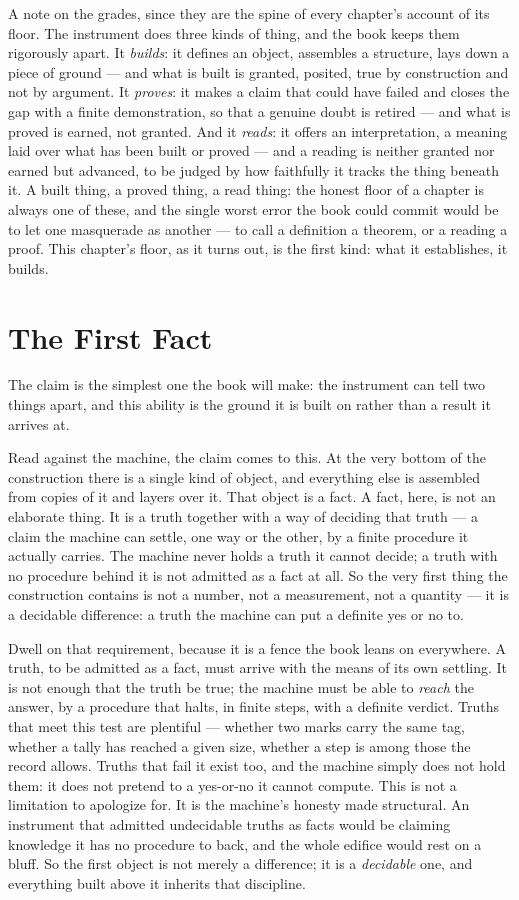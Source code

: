 A note on the grades, since they are the spine of every chapter's account of its floor. The instrument does
three kinds of thing, and the book keeps them rigorously apart. It \emph{builds}: it defines an object,
assembles a structure, lays down a piece of ground --- and what is built is granted, posited, true by
construction and not by argument. It \emph{proves}: it makes a claim that could have failed and closes the gap
with a finite demonstration, so that a genuine doubt is retired --- and what is proved is earned, not granted.
And it \emph{reads}: it offers an interpretation, a meaning laid over what has been built or proved --- and a
reading is neither granted nor earned but advanced, to be judged by how faithfully it tracks the thing beneath
it. A built thing, a proved thing, a read thing: the honest floor of a chapter is always one of these, and the
single worst error the book could commit would be to let one masquerade as another --- to call a definition a
theorem, or a reading a proof. This chapter's floor, as it turns out, is the first kind: what it establishes, it
builds.

\section{The First Fact}

The claim is the simplest one the book will make: the instrument can tell two things apart, and this ability is
the ground it is built on rather than a result it arrives at.

Read against the machine, the claim comes to this. At the very bottom of the construction there is a single kind
of object, and everything else is assembled from copies of it and layers over it. That object is a fact. A fact,
here, is not an elaborate thing. It is a truth together with a way of deciding that truth --- a claim the machine
can settle, one way or the other, by a finite procedure it actually carries. The machine never holds a truth it
cannot decide; a truth with no procedure behind it is not admitted as a fact at all. So the very first thing the
construction contains is not a number, not a measurement, not a quantity --- it is a decidable difference: a
truth the machine can put a definite yes or no to.

Dwell on that requirement, because it is a fence the book leans on everywhere. A truth, to be admitted as a fact,
must arrive with the means of its own settling. It is not enough that the truth be true; the machine must be able
to \emph{reach} the answer, by a procedure that halts, in finite steps, with a definite verdict. Truths that meet
this test are plentiful --- whether two marks carry the same tag, whether a tally has reached a given size,
whether a step is among those the record allows. Truths that fail it exist too, and the machine simply does not
hold them: it does not pretend to a yes-or-no it cannot compute. This is not a limitation to apologize for. It is
the machine's honesty made structural. An instrument that admitted undecidable truths as facts would be claiming
knowledge it has no procedure to back, and the whole edifice would rest on a bluff. So the first object is not
merely a difference; it is a \emph{decidable} one, and everything built above it inherits that discipline.

